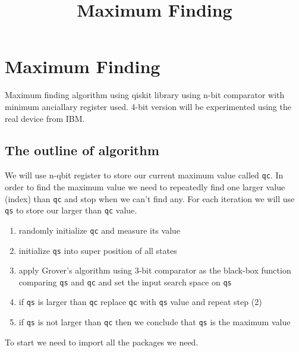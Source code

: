 \documentclass[11pt]{article}
\title{Maximum Finding}
\providecommand{\tightlist}{%
      \setlength{\itemsep}{0pt}\setlength{\parskip}{0pt}}
\begin{document}
    
    
    \maketitle
    
    

    
    \hypertarget{maximum-finding}{%
\section{Maximum Finding}\label{maximum-finding}}

Maximum finding algorithm using qiskit library using n-bit comparator
with minimum anciallary register used. 4-bit version will be
experimented using the real device from IBM.

\hypertarget{the-outline-of-algorithm}{%
\subsection{The outline of algorithm}\label{the-outline-of-algorithm}}

We will use n-qbit register to store our current maximum value called
\texttt{qc}. In order to find the maximum value we need to repeatedly
find one larger value (index) than \texttt{qc} and stop when we can't
find any. For each iteration we will use \texttt{qs} to store our larger
than \texttt{qc} value.

\begin{enumerate}
\def\labelenumi{\arabic{enumi}.}
\setcounter{enumi}{-1}
\tightlist
\item
  randomly initialize \texttt{qc} and measure its value
\item
  initialize \texttt{qs} into super position of all states
\item
  apply Grover's algorithm using 3-bit comparator as the black-box
  function comparing \texttt{qs} and \texttt{qc} and set the input
  search space on \texttt{qs}
\item
  if \texttt{qs} is larger than \texttt{qc} replace \texttt{qc} with
  \texttt{qs} value and repeat step (2)
\item
  if \texttt{qs} is not larger than \texttt{qc} then we conclude that
  \texttt{qs} is the maximum value
\end{enumerate}

    To start we need to import all the packages we need.
\end{document}
